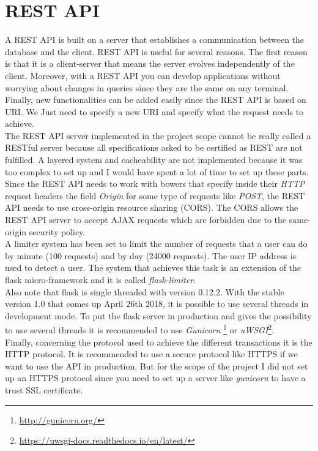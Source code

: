 \section{REST API}
A REST API is built on a server that establishes a communication between the database and the client. REST API is useful for several reasons. The first reason is that it is a client-server that means the server evolves independently of the client. Moreover, with a REST API you can develop applications without worrying about changes in queries since they are the same on any terminal. Finally, new functionalities can be added easily since the REST API is based on URI. We Just need to specify a new URI and specify what the request needs to achieve.\\

The REST API server implemented in the project scope cannot be really called a RESTful server because all specifications asked to be certified as REST are not fulfilled. A layered system and cacheability are not implemented because it was too complex to set up and I would have spent a lot of time to set up these parts.\\

Since the REST API needs to work with bowers that specify inside their \textit{HTTP} request headers the field \textit{Origin} for some type of requests like \textit{POST}, the REST API needs to use cross-origin resource sharing (CORS). The CORS allows the REST API server to accept AJAX requests which are forbidden due to the same-origin security policy.\\

A limiter system has been set to limit the number of requests that a user can do by minute (100 requests) and by day (24000 requests). The user IP address is used to detect a user. The system that achieves this task is an extension of the flask micro-framework and it is called \textit{flask-limiter}.\\

Also note that flask is single threaded with version 0.12.2. With the stable version 1.0 that comes up April 26th 2018, it is possible to use several threads in development mode. To put the flask server in production and gives the possibility to use several threads it is recommended to use \textit{Gunicorn} \footnote{\url{http://gunicorn.org/}} or \textit{uWSGI}\footnote{\url{https://uwsgi-docs.readthedocs.io/en/latest/}}.\\

Finally, concerning the protocol used to achieve the different transactions it is the HTTP protocol. It is recommended to use a secure protocol like HTTPS if we want to use the API in production. But for the scope of the project I did not set up an HTTPS protocol since you need to set up a server like \textit{gunicorn} to have a trust SSL certificate.
